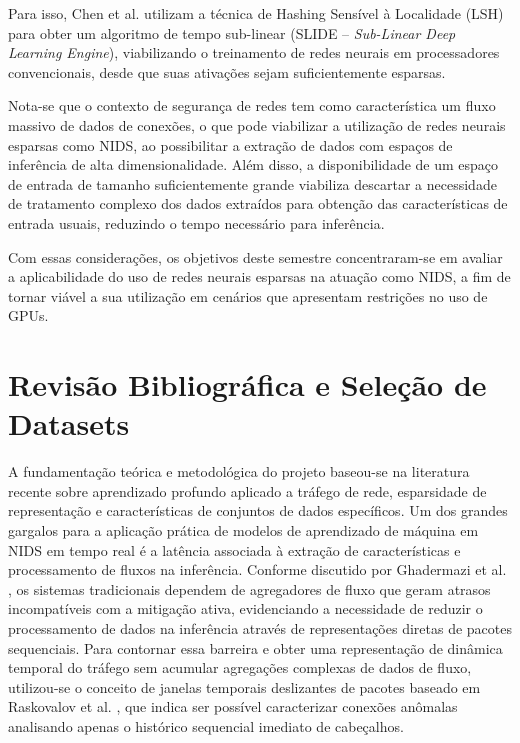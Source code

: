 \documentclass[11pt,a4paper,oneside]{article}
\begin{document}
Para isso, Chen et al. \cite{chen2020slide} utilizam a técnica de Hashing Sensível à Localidade (LSH) para obter um algoritmo de tempo sub-linear (SLIDE -- \textit{Sub-Linear Deep Learning Engine}), viabilizando o treinamento de redes neurais em processadores convencionais, desde que suas ativações sejam suficientemente esparsas.

Nota-se que o contexto de segurança de redes tem como característica um fluxo massivo de dados de conexões, o que pode viabilizar a utilização de redes neurais esparsas como NIDS, ao possibilitar a extração de dados com espaços de inferência de alta dimensionalidade. Além disso, a disponibilidade de um espaço de entrada de tamanho suficientemente grande viabiliza descartar a necessidade de tratamento complexo dos dados extraídos para obtenção das características de entrada usuais, reduzindo o tempo necessário para inferência.

Com essas considerações, os objetivos deste semestre concentraram-se em avaliar a aplicabilidade do uso de redes neurais esparsas na atuação como NIDS, a fim de tornar viável a sua utilização em cenários que apresentam restrições no uso de GPUs.

\section{Revisão Bibliográfica e Seleção de Datasets}
A fundamentação teórica e metodológica do projeto baseou-se na literatura recente sobre aprendizado profundo aplicado a tráfego de rede, esparsidade de representação e características de conjuntos de dados específicos. Um dos grandes gargalos para a aplicação prática de modelos de aprendizado de máquina em NIDS em tempo real é a latência associada à extração de características e processamento de fluxos na inferência. Conforme discutido por Ghadermazi et al. \cite{ghadermazi2024towards}, os sistemas tradicionais dependem de agregadores de fluxo que geram atrasos incompatíveis com a mitigação ativa, evidenciando a necessidade de reduzir o processamento de dados na inferência através de representações diretas de pacotes sequenciais. Para contornar essa barreira e obter uma representação de dinâmica temporal do tráfego sem acumular agregações complexas de dados de fluxo, utilizou-se o conceito de janelas temporais deslizantes de pacotes baseado em Raskovalov et al. \cite{raskovalov2024nids}, que indica ser possível caracterizar conexões anômalas analisando apenas o histórico sequencial imediato de cabeçalhos.
\end{document}
